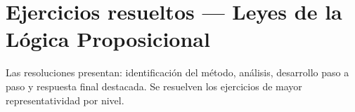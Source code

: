 
\newpage
\section{Ejercicios resueltos --- Leyes de la L\'{o}gica Proposicional}

\begin{tcolorbox}[
  enhanced, colback=GrisClaro, colframe=AzulPizarra,
  arc=2pt, boxrule=0.7pt, left=8pt, right=8pt, top=4pt, bottom=4pt
]
\small\sffamily
Las resoluciones presentan: identificación del método, análisis, desarrollo
paso a paso y respuesta final destacada. Se resuelven los ejercicios de
mayor representatividad por nivel.
\end{tcolorbox}
\vspace{0.4cm}

